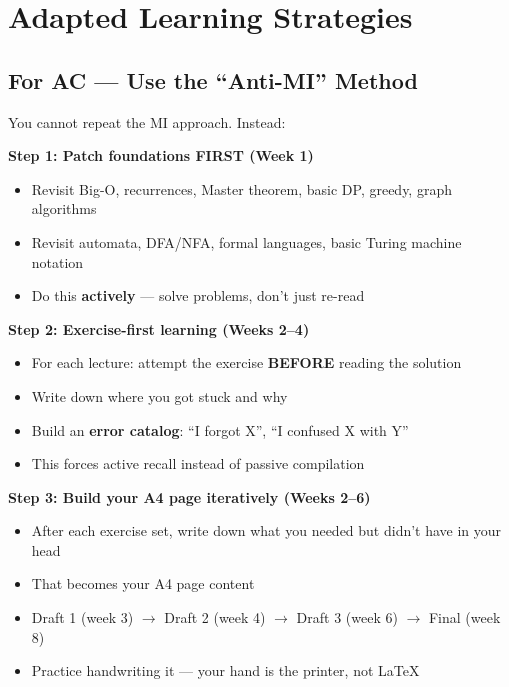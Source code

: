 \documentclass[11pt,a4paper]{article}
\begin{document}
\section{Adapted Learning Strategies}

\subsection{\textcolor{accolor}{For AC --- Use the ``Anti-MI'' Method}}

You cannot repeat the MI approach. Instead:

\textbf{Step 1: Patch foundations FIRST (Week 1)}
\begin{itemize}[nosep]
\item Revisit Big-O, recurrences, Master theorem, basic DP, greedy, graph algorithms
\item Revisit automata, DFA/NFA, formal languages, basic Turing machine notation
\item Do this \textbf{actively} --- solve problems, don't just re-read
\end{itemize}

\textbf{Step 2: Exercise-first learning (Weeks 2--4)}
\begin{itemize}[nosep]
\item For each lecture: attempt the exercise \textbf{BEFORE} reading the solution
\item Write down where you got stuck and why
\item Build an \textbf{error catalog}: ``I forgot X'', ``I confused X with Y''
\item This forces active recall instead of passive compilation
\end{itemize}

\textbf{Step 3: Build your A4 page iteratively (Weeks 2--6)}
\begin{itemize}[nosep]
\item After each exercise set, write down what you needed but didn't have in your head
\item That becomes your A4 page content
\item Draft 1 (week 3) $\rightarrow$ Draft 2 (week 4) $\rightarrow$ Draft 3 (week 6) $\rightarrow$ Final (week 8)
\item Practice handwriting it --- your hand is the printer, not LaTeX
\end{itemize}
\end{document}

